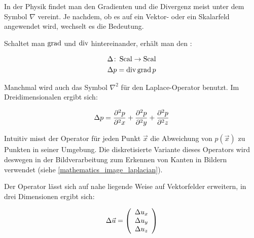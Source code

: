 In der Physik findet man den Gradienten und die Divergenz meist unter dem Symbol
$\nabla$ vereint. Je nachdem, ob es auf ein Vektor- oder ein Skalarfeld
angewendet wird, wechselt es die Bedeutung.

Schaltet man $\operatorname*{grad}$ und $\operatorname*{div}$ hintereinander, erhält man den
:

\begin{gather}
\Delta \colon \operatorname*{Scal} \to \operatorname*{Scal} \\
\Delta p = \operatorname*{div} \operatorname*{grad} p
\end{gather}

Manchmal wird auch das Symbol $\nabla^2$ für den Laplace-Operator benutzt. Im Dreidimensionalen ergibt sich:

\begin{equation}
\Delta p =
\frac{\partial^2 p}{\partial^2 x} +
\frac{\partial^2 p}{\partial^2 y} +
\frac{\partial^2 p}{\partial^2 z}
\end{equation}

Intuitiv misst der Operator für jeden Punkt $\vec{x}$ die Abweichung von
$p(\vec{x})$ zu Punkten in seiner Umgebung. Die diskretisierte Variante dieses
Operators wird deswegen in der Bildverarbeitung zum Erkennen von Kanten in
Bildern verwendet (siehe \autoref{mathematics_image_laplacian}).

Der Operator lässt sich auf nahe liegende Weise auf Vektorfelder erweitern, in drei Dimensionen
ergibt sich:

\begin{equation}
\Delta \vec{u} =
\left(
	\begin{array}{c}
		\Delta u_x \\
		\Delta u_y \\
		\Delta u_z
	\end{array}
\right)
\end{equation}

